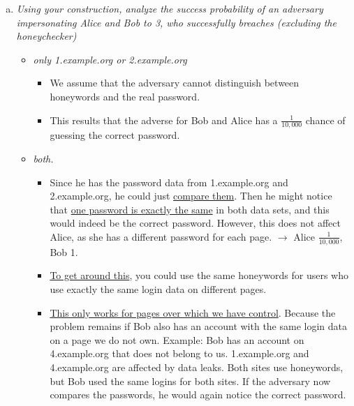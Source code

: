 \begin{enumerate}[(a)]
\begin{enumerate}[1.]
    \end{enumerate}
  
      
    \item {\itshape Using your construction, analyze the success probability of an adversary impersonating Alice and Bob to 3, who successfully breaches (excluding the honeychecker)}
    \begin{itemize}
        \item {\itshape only 1.example.org or 2.example.org}
        \begin{itemize}
            \item We assume that the adversary cannot distinguish between honeywords and the real password.
            \item This results that the adverse for Bob and Alice has a $\frac{1}{10,000}$ chance of guessing the correct password.
        \end{itemize}
        \item {\itshape both.}
        \begin{itemize}
            \item Since he has the password data from 1.example.org and 2.example.org, he could just \underline{compare them}. Then he might notice that \underline{one password is exactly the same} in both data sets, and this would indeed be the correct password. However, this does not affect Alice, as she has a different password for each page. $\rightarrow$ Alice $\frac{1}{10,000}$, Bob 1.
            \item \underline{To get around this}, you could use the same honeywords for users who use exactly the same login data on different pages.
            \item \underline{This only works for pages over which we have control}. Because the problem remains if Bob also has an account with the same login data on a page we do not own. Example: Bob has an account on 4.example.org that does not belong to us. 1.example.org and 4.example.org are affected by data leaks. Both sites use honeywords, but Bob used the same logins for both sites. If the adversary now compares the passwords, he would again notice the correct password.
        \end{itemize}
    \end{itemize}

   
    
\end{enumerate}


\newpage  
